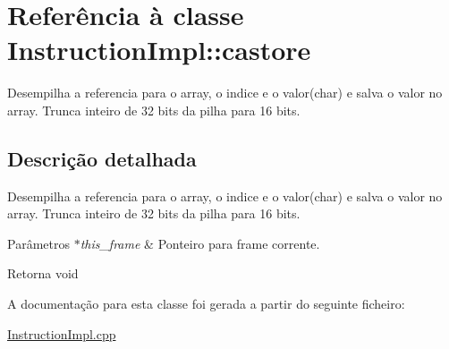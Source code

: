 \hypertarget{class_instruction_impl_1_1castore}{}\section{Referência à classe Instruction\+Impl\+:\+:castore}
\label{class_instruction_impl_1_1castore}


Desempilha a referencia para o array, o indice e o valor(char) e salva o valor no array. Trunca inteiro de 32 bits da pilha para 16 bits.  




\subsection{Descrição detalhada}
Desempilha a referencia para o array, o indice e o valor(char) e salva o valor no array. Trunca inteiro de 32 bits da pilha para 16 bits. 


\begin{DoxyParams}{Parâmetros}
{\em $\ast$this\+\_\+frame} & Ponteiro para frame corrente. \\
\hline
\end{DoxyParams}
\begin{DoxyReturn}{Retorna}
void 
\end{DoxyReturn}


A documentação para esta classe foi gerada a partir do seguinte ficheiro\+:\begin{DoxyCompactItemize}
\item 
\hyperlink{_instruction_impl_8cpp}{Instruction\+Impl.\+cpp}\end{DoxyCompactItemize}
